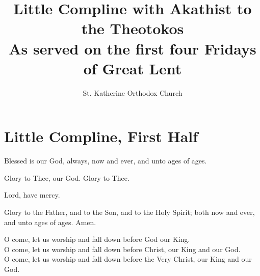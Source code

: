 \documentclass[twoside, letterpaper, 12pt]{report}
\title{Little Compline with Akathist to the Theotokos\\
       As served on the first four Fridays of Great Lent}
\author{St. Katherine Orthodox Church}
\date{}%
\begin{document}
\maketitle
\pagestyle{empty} %


\cleardoublepage
\pagestyle{plain}
\setcounter{page}{1}

\chapter*{Little Compline, First Half}
\begin{priest}
\item Blessed is our God, always, now and ever, and unto ages of ages.
\end{priest}


\begin{priest}
\item Glory to Thee, our God. Glory to Thee.
\item 
\end{priest}




\begin{reader}
\item Lord, have mercy. \twelve
\item Glory to the Father, and to the Son, and to the Holy Spirit;
  both now and ever, 
  and unto ages of ages. Amen.

\item O come, let us worship and fall down before God our King.\\
  O come, let us worship and fall down before Christ, our King and our God.\\
  O come, let us worship and fall down before the Very Christ, our King and our God.
\end{reader}
\end{document}
